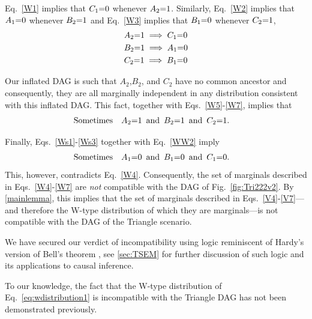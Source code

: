 Eq.~\eqref{W1} %
implies that $C_1\mathord{=} 0$ whenever $A_2 \mathord{=} 1$. Similarly, Eq.~\eqref{W2} implies that $A_1\mathord{=} 0$ whenever $B_2\mathord{=} 1$ and Eq.~\eqref{W3} implies that $B_1\mathord{=} 0$ whenever $C_2\mathord{=} 1$, 
\begin{align} 
&A_2 \mathord{=} 1 \implies C_1\mathord{=} 0\label{Ws1}\\
&B_2\mathord{=} 1 \implies A_1\mathord{=} 0\label{Ws2}\\
&C_2 \mathord{=} 1 \implies B_1 \mathord{=} 0\label{Ws3}
\end{align}

Our inflated DAG is such that $A_2$,$B_2$, and $C_2$ have no common ancestor and consequently, they are all marginally independent in any distribution consistent with this inflated DAG.  This fact, together with Eqs.~\eqref{W5}-\eqref{W7}, implies that %
\begin{align} \label{WW2}
\text{Sometimes} \quad &A_2 \mathord{=} 1\,\text{ and }\, B_2 \mathord{=} 1\,\text{ and }\, C_2 \mathord{=} 1.
\end{align} 

Finally, Eqs.~\eqref{Ws1}-\eqref{Ws3} together with Eq.~\eqref{WW2} imply
\begin{align} \label{WW3}
\text{Sometimes} \quad &A_1 \mathord{=} 0\,\text{ and }\, B_1 \mathord{=} 0\,\text{ and }\, C_1 \mathord{=} 0.
\end{align}
This, however, contradicts Eq.~\eqref{W4}.  Consequently, the set of marginals described in Eqs.~\eqref{W4}-\eqref{W7} are \emph{not} compatible with the DAG of Fig.~\ref{fig:Tri222v2}.  By \cref{mainlemma}, this implies that the set of marginals described in Eqs.~\eqref{V4}-\eqref{V7}---and therefore the W-type distribution of which they are marginals---is not compatible with the DAG of the Triangle scenario.

We have secured our verdict of incompatibility using logic reminiscent of  Hardy's version of Bell's theorem \cite{L.Hardy:PRL:1665,Mansfield2012}, see \cref{sec:TSEM} for further discussion of such logic and its applications to causal inference. 

To our knowledge, the fact that the W-type distribution of Eq.~\eqref{eq:wdistribution1} is incompatible with the Triangle DAG has not been demonstrated previously.


